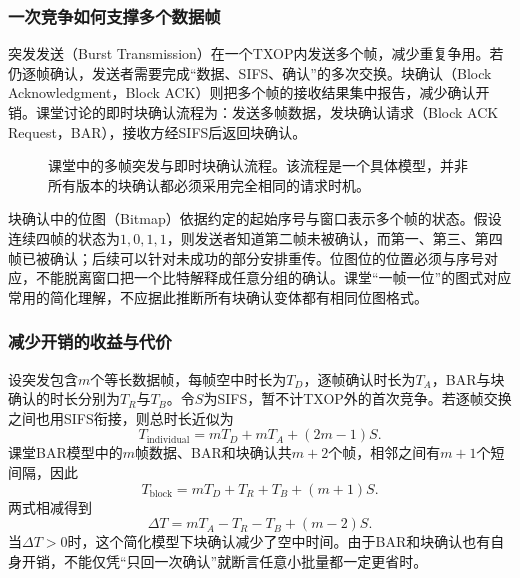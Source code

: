 \subsubsection{一次竞争如何支撑多个数据帧}

突发发送（Burst Transmission）在一个TXOP内发送多个帧，减少重复争用。若仍逐帧确认，发送者需要完成“数据、SIFS、确认”的多次交换。块确认（Block Acknowledgment，Block ACK）则把多个帧的接收结果集中报告，减少确认开销。课堂讨论的即时块确认流程为：发送多帧数据，发块确认请求（Block ACK Request，BAR），接收方经SIFS后返回块确认。

\begin{figure}[htbp]
\centering
{}
\caption{课堂中的多帧突发与即时块确认流程。该流程是一个具体模型，并非所有版本的块确认都必须采用完全相同的请求时机。}
\end{figure}

块确认中的位图（Bitmap）依据约定的起始序号与窗口表示多个帧的状态。假设连续四帧的状态为$1,0,1,1$，则发送者知道第二帧未被确认，而第一、第三、第四帧已被确认；后续可以针对未成功的部分安排重传。位图位的位置必须与序号对应，不能脱离窗口把一个比特解释成任意分组的确认。课堂“一帧一位”的图式对应常用的简化理解，不应据此推断所有块确认变体都有相同位图格式。

\subsubsection{减少开销的收益与代价}

设突发包含$m$个等长数据帧，每帧空中时长为$T_D$，逐帧确认时长为$T_A$，BAR与块确认的时长分别为$T_R$与$T_B$。令$S$为SIFS，暂不计TXOP外的首次竞争。若逐帧交换之间也用SIFS衔接，则总时长近似为
\begin{equation}
T_{\mathrm{individual}}=mT_D+mT_A+(2m-1)S.
\end{equation}
课堂BAR模型中的$m$帧数据、BAR和块确认共$m+2$个帧，相邻之间有$m+1$个短间隔，因此
\begin{equation}
T_{\mathrm{block}}=mT_D+T_R+T_B+(m+1)S.
\end{equation}
两式相减得到
\begin{equation}
\Delta T=mT_A-T_R-T_B+(m-2)S.
\end{equation}
当$\Delta T>0$时，这个简化模型下块确认减少了空中时间。由于BAR和块确认也有自身开销，不能仅凭“只回一次确认”就断言任意小批量都一定更省时。

